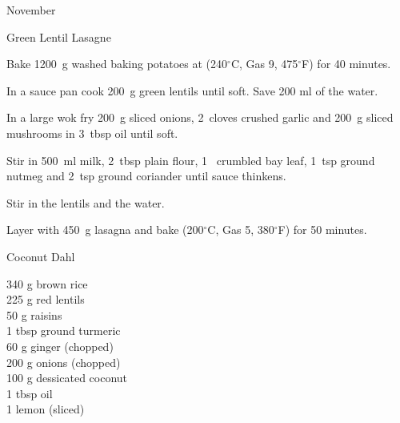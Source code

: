 \begin{menu}{November}
\begin{recipe}{2}{Green Lentil Lasagne}
    \begin{instructions}
    \item 
    Bake
    1200~g washed baking potatoes
    at
    (240$^{\circ}$C, Gas 9, 475$^{\circ}$F) for 40 minutes.
  \item 
        In a sauce pan cook
        200~g  green lentils
        until soft.
        Save 200 ml of the water.
      \item 
        In a large wok fry
        200~g sliced onions,
        2~cloves crushed garlic
        and
        200~g sliced mushrooms
        in
        3~tbsp  oil
        until soft.
      \item 
        Stir in
        500~ml  milk,
        2~tbsp  plain flour,
        1~ crumbled bay leaf,
        1~tsp  ground nutmeg
        and
        2~tsp  ground coriander
        until sauce thinkens.
      \item 
        Stir in
        the lentils
        and
        the water.
      \item 
        Layer with
        450~g  lasagna
        and bake (200$^{\circ}$C, Gas 5, 380$^{\circ}$F) for 50 minutes.
      
    \end{instructions}
    \end{recipe}%
  
    \begin{recipe}{2}{Coconut Dahl}%
		\begin{ingredients}
		340 g brown rice  \\
	225 g red lentils  \\
	50 g raisins  \\
	1 tbsp ground turmeric  \\
	60 g ginger (chopped) \\
	200 g onions (chopped) \\
	100 g dessicated coconut  \\
	1 tbsp oil  \\
	1  lemon (sliced) \\
	
		\end{ingredients}
	
	
	

\end{recipe}
\end{menu}
